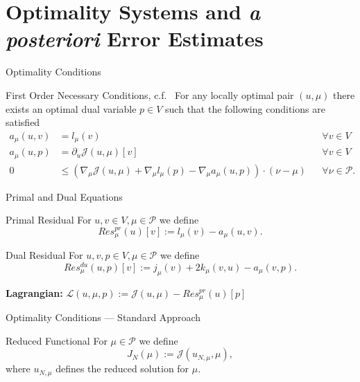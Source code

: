 \section{Optimality Systems and \textit{a posteriori} Error Estimates}

\begin{frame}{Optimality Conditions}
    \begin{block}{First Order Necessary Conditions, c.f.~\cite{Keil2021}}
        For any locally optimal pair $(u, \mu)$ there exists an optimal dual variable $p \in V$ such that the following conditions are satisfied
        \begin{align*}
            a_\mu(u, v) &= l_\mu(v) &&\forall v \in V \\
            a_\mu(u, p) &= \partial_u \mathcal{J}(u, \mu)[v] &&\forall v \in V \\
            0 &\leq (\nabla_\mu \mathcal{J}(u, \mu) + \nabla_\mu l_\mu(p) - \nabla_\mu a_\mu(u, p)) \cdot (\nu - \mu) &&\forall \nu \in \mathcal{P}.
        \end{align*}
    \end{block}
\end{frame}

\begin{frame}{Primal and Dual Equations}
    \begin{block}{Primal Residual}
        For $u, v \in V, \mu \in \mathcal{P}$ we define
        \begin{equation*}
            Res_\mu^{pr}(u)[v] := l_\mu(v) - a_\mu(u, v).
        \end{equation*}
    \end{block}
    \begin{block}{Dual Residual}
        For $u, v, p \in V, \mu \in \mathcal{P}$ we define
        \begin{equation*}
            Res_\mu^{du}(u, p)[v] := j_\mu(v) + 2 k_\mu(v, u) - a_\mu(v, p).
        \end{equation*}
    \end{block}
    \textbf{Lagrangian:} $\mathcal{L}(u, \mu, p) := \mathcal{J}(u, \mu) - Res_\mu^{pr}(u)[p]$
\end{frame}

\begin{frame}{Optimality Conditions --- Standard Approach}
    \begin{block}{Reduced Functional}
        For $\mu \in \mathcal{P}$ we define
        \begin{equation*}
            J_N(\mu) := \mathcal{J}(u_{N, \mu}, \mu),
        \end{equation*}
        where $u_{N, \mu}$ defines the reduced solution for $\mu$.
    \end{block}
\end{frame}

